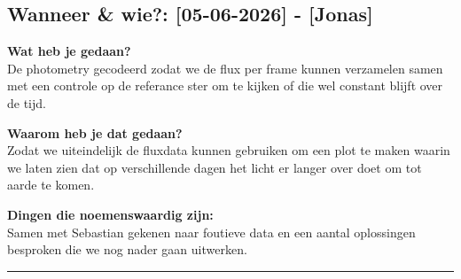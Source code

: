 
\subsection*{Wanneer \& wie?: [05-06-2026] - [Jonas]}

\textbf{Wat heb je gedaan?}\\
De photometry gecodeerd zodat we de flux per frame kunnen verzamelen samen met een controle op de referance ster om te kijken of die wel constant blijft over de tijd.
\vspace{0.3cm} 

\noindent \textbf{Waarom heb je dat gedaan?}\\
Zodat we uiteindelijk de fluxdata kunnen gebruiken om een plot te maken waarin we laten zien dat op verschillende dagen het licht er langer over doet om tot aarde te komen.

\noindent \textbf{Dingen die noemenswaardig zijn:}\\
Samen met Sebastian gekenen naar foutieve data en een aantal oplossingen besproken die we nog nader gaan uitwerken.


\vspace{0.5cm}
\hrule 
\vspace{0.5cm}
